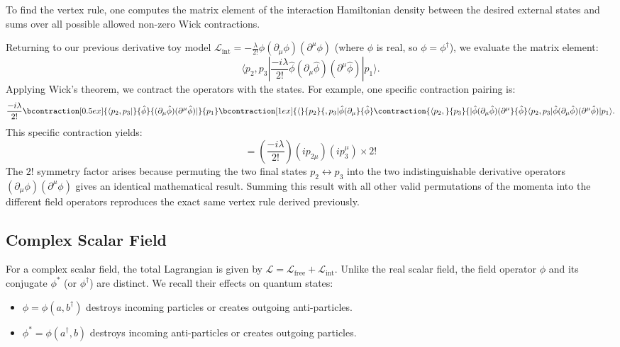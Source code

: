 To find the vertex rule, one computes the matrix element of the interaction Hamiltonian density between the desired external states and sums over all possible allowed non-zero Wick contractions.

Returning to our previous derivative toy model $\mathcal{L}_{\text{int}} = -\frac{\lambda}{2!} \phi (\partial_\mu \phi)(\partial^\mu \phi)$ (where $\phi$ is real, so $\phi = \phi^\dagger$), we evaluate the matrix element:
\[
    \langle p_2, p_3 | \frac{-i\lambda}{2!} \hat{\phi} (\partial_\mu \hat{\phi})(\partial^\mu \hat{\phi}) | p_1 \rangle.
\]
Applying Wick's theorem, we contract the operators with the states. For example, one specific contraction pairing is:
\[
    \frac{-i\lambda}{2!} \bcontraction[0.5ex]{\langle p_2, p_3 |}{\hat{\phi}}{(\partial_\mu \hat{\phi})(\partial^\mu \hat{\phi}) |}{p_1} \bcontraction[1ex]{\langle}{p_2}{, p_3 | \hat{\phi} (\partial_\mu}{\hat{\phi}} \contraction{\langle p_2,}{p_3}{| \hat{\phi} (\partial_\mu \hat{\phi})(\partial^\mu}{\hat{\phi}} \langle p_2, p_3 | \hat{\phi} (\partial_\mu \hat{\phi})(\partial^\mu \hat{\phi}) | p_1 \rangle.
\]
This specific contraction yields:
\[
    = \left(\frac{-i\lambda}{2!}\right) (i p_{2\mu}) (i p_3^\mu) \times 2!
\]
The $2!$ symmetry factor arises because permuting the two final states $p_2 \leftrightarrow p_3$ into the two indistinguishable derivative operators $(\partial_\mu \phi)(\partial^\mu \phi)$ gives an identical mathematical result. Summing this result with all other valid permutations of the momenta into the different field operators reproduces the exact same vertex rule derived previously.

\subsection{Complex Scalar Field}

For a complex scalar field, the total Lagrangian is given by \(\mathcal{L} = \mathcal{L}_{\text{free}} + \mathcal{L}_{\text{int}}\). Unlike the real scalar field, the field operator \(\phi\) and its conjugate \(\phi^*\) (or \(\phi^\dagger\)) are distinct. We recall their effects on quantum states:
\begin{itemize}
    \item \(\phi = \phi(a, b^\dagger)\) destroys incoming particles or creates outgoing anti-particles.
    \item \(\phi^* = \phi(a^\dagger, b)\) destroys incoming anti-particles or creates outgoing particles.
\end{itemize}

